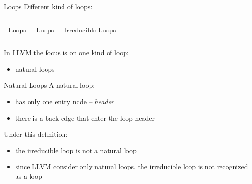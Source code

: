 \documentclass[10pt,mathserif]{beamer}
\begin{document}
\begin{frame}{Loops}
Different kind of loops:

\begin{columns}[t]
\begin{block}{- Loops}
\centering

\end{block}

\begin{block}{ Loops}
\centering

\end{block}

\begin{block}{Irreducible Loops}
\centering

\end{block}
\end{columns}

\bigskip
In LLVM the focus is on one kind of loop:

\begin{itemize}
\item natural loops
\end{itemize}
\end{frame}

\begin{frame}{Natural Loops}
A natural loop:

\begin{itemize}
\item has only one entry node -- \emph{header}
\item there is a back edge that enter the loop header
\end{itemize}

\vfill
Under this definition:

\begin{itemize}
\item the irreducible loop is not a natural loop
\item since LLVM consider only natural loops, the irreducible loop \alert{is not
      recognized} as a loop
\end{itemize}
\end{frame}
\end{document}
